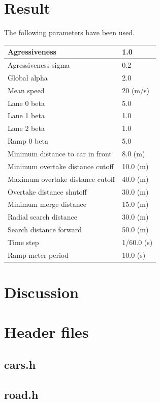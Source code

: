 \documentclass{article}
\begin{document}
\section{Result}
  The following parameters have been used.
  \begin{tabular}{| l | l |}
    \hline
    Agressiveness & 1.0 \\ \hline
    Agressiveness sigma & 0.2 \\ \hline
    Global alpha & 2.0 \\ \hline
    Mean speed & 20 (m/s) \\ \hline
    Lane 0 beta & 5.0 \\ \hline
    Lane 1 beta & 1.0 \\ \hline
    Lane 2 beta & 1.0 \\ \hline
    Ramp 0 beta & 5.0 \\ \hline
    Minimum distance to car in front & 8.0 (m) \\ \hline
    Minimum overtake distance cutoff & 10.0 (m) \\ \hline
    Maximum overtake distance cutoff & 40.0 (m) \\ \hline
    Overtake distance shutoff & 30.0 (m) \\ \hline
    Minimum merge distance & 15.0 (m) \\ \hline
    Radial search distance & 30.0 (m) \\ \hline
    Search distance forward & 50.0 (m) \\ \hline
    Time step & 1/60.0 (s) \\ \hline
    Ramp meter period & 10.0 (s) \\ \hline
  \end{tabular}
\section{Discussion}

\printbibliography
\pagebreak
\appendix

\section{Header files}
  \subsection{cars.h}
    
  \subsection{road.h}
    
\end{document}
